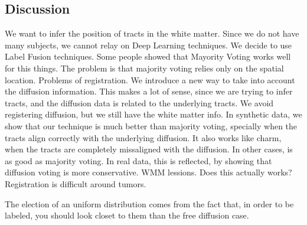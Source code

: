 
\subsection{Discussion}
We want to infer the position of tracts in the white matter.
Since we do not have many subjects, we cannot relay on Deep Learning techniques.
We decide to use Label Fusion techniques.
Some people showed that Mayority Voting works well for this things.
The problem is that majority voting relies only on the spatial location.
Problems of registration.
We introduce a new way to take into account the diffusion information.
This makes a lot of sense, since we are trying to infer tracts, and the 
diffusion data is related to the underlying tracts.
We avoid registering diffusion, but we still have the white matter info.
In synthetic data, we show that our technique is much better than
majority voting, specially when the tracts align correctly with the
underlying diffusion. It also works like charm, when the tracts are completely
missaligned with the diffusion. In other cases, is as good as majority voting.
In real data, this is reflected, by showing that diffusion voting is more
conservative. WMM lessions.
Does this actually works? Registration is difficult around tumors.


The election of an uniform distribution comes from the fact that, in order to
be labeled, you should look closet to them than the free diffusion case.


